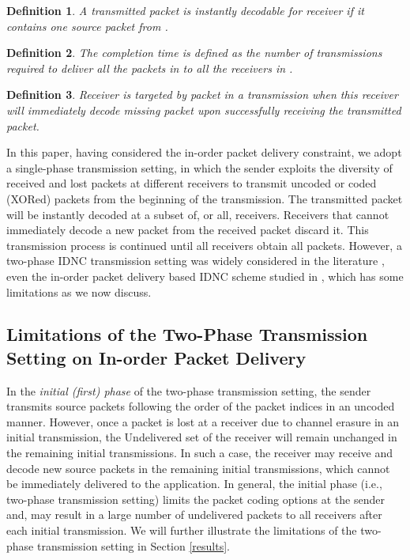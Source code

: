 \documentclass[12pt, peerreview, onecolumn]{IEEEtran}
\begin{document}
\newtheorem{definitions}{\textbf{Definition}}
\begin{definitions}
\emph{A transmitted packet is instantly decodable for receiver  if it contains one source packet from .}
\end{definitions}
\begin{definitions}
\emph{The completion time is defined as the number of transmissions required to deliver all the packets in  to all the receivers in .}
\end{definitions}
\begin{definitions}
\emph{Receiver  is targeted by  packet  in a  transmission  when this receiver  will immediately decode  missing packet  upon  successfully receiving   the transmitted packet.}
\end{definitions}




In this paper, having considered the in-order packet delivery constraint, we adopt a single-phase transmission setting, in which the sender exploits the diversity of received and lost packets at different receivers to transmit uncoded  or coded (XORed) packets from the beginning of the transmission. The transmitted packet will be instantly decoded at a subset of, or all,  receivers. Receivers that  cannot immediately decode a new packet from the received packet discard it. This  transmission process is  continued until all receivers obtain all packets. However, a  two-phase IDNC transmission  setting was  widely considered in the literature   \cite{sorour2012completion,aboutorabenabling,sadeghi2010optimal,sorour2010decoding,le2013instantly}, even the in-order packet delivery based IDNC scheme studied in \cite{wanginstantly}, which has some limitations as we now discuss.  \vspace{-6mm}
\subsection{Limitations   of the  Two-Phase  Transmission Setting  on In-order Packet Delivery} \label{sec:initial}
In the  \emph{initial (first) phase} of the two-phase transmission setting, the sender  transmits  source packets following the order of the packet indices in an uncoded manner. However, once a packet is lost at a receiver  due to channel  erasure in an initial transmission, the Undelivered set of the receiver will remain unchanged in the remaining initial transmissions. In such a case, the receiver may receive and decode new source packets in the remaining initial transmissions, which cannot be immediately delivered to the application. In general,   the initial  phase (i.e., two-phase transmission setting) limits the packet coding options at the sender and, may result in a large number of undelivered packets to all receivers after each initial transmission. We will further illustrate the limitations of the  two-phase transmission setting  in Section \ref{results}.
\end{document}
